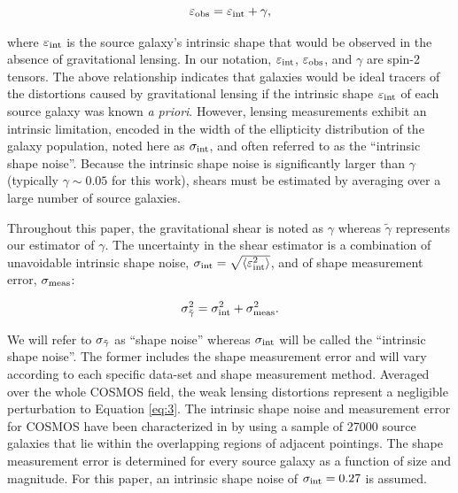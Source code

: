 \documentclass[12pt]{emulateapj}
\begin{document}
\begin{equation}
  \varepsilon_{\rm obs} = \varepsilon_{\rm int}+\gamma,
\label{ellipticity_shear}
\end{equation}

\noindent where $\varepsilon_{\rm int}$ is the source galaxy's
intrinsic shape that would be observed in the absence of gravitational
lensing. In our notation, $\varepsilon_{\rm int}$, $\varepsilon_{\rm
  obs}$, and $\gamma$ are spin-2 tensors. The above relationship
indicates that galaxies would be ideal tracers of the distortions
caused by gravitational lensing if the intrinsic shape
$\varepsilon_{\rm int}$ of each source galaxy was known \textit{a
  priori}. However, lensing measurements exhibit an intrinsic
limitation, encoded in the width of the ellipticity distribution of
the galaxy population, noted here as $\sigma_{\rm int}$, and often
referred to as the ``intrinsic shape noise''. Because the intrinsic
shape noise \citep[of order $\sigma_{\rm int} \sim
0.27$,][]{Leauthaud:2007} is significantly larger than $\gamma$
(typically $\gamma \sim 0.05$ for this work), shears must be estimated
by averaging over a large number of source galaxies.

Throughout this paper, the gravitational shear is noted as $\gamma$
whereas $\tilde\gamma$ represents our estimator of $\gamma$. The
uncertainty in the shear estimator is a combination of unavoidable
intrinsic shape noise, $\sigma_{\rm int}=\sqrt{\langle
  \varepsilon_{\rm int}^2\rangle}$, and of shape measurement error,
$\sigma_{\rm meas}$:

\begin{equation}\label{eq:3}
  \sigma_{\rm \tilde\gamma}^2 = \sigma_{\rm int}^2+\sigma_{\rm meas}^2.
\end{equation}
 
We will refer to $\sigma_{\rm \tilde\gamma}$ as ``shape noise''
whereas $\sigma_{\rm int}$ will be called the ``intrinsic shape
noise''. The former includes the shape measurement error and will vary
according to each specific data-set and shape measurement
method. Averaged over the whole COSMOS field, the weak lensing
distortions represent a negligible perturbation to Equation
\ref{eq:3}. The intrinsic shape noise and measurement error for COSMOS
have been characterized in \citet[][]{Leauthaud:2007} by using a
sample of 27000 source galaxies that lie within the overlapping
regions of adjacent pointings. The shape measurement error is
determined for every source galaxy as a function of size and
magnitude. For this paper, an intrinsic shape noise of $\sigma_{\rm
  int}=0.27$ is assumed.
\end{document}
